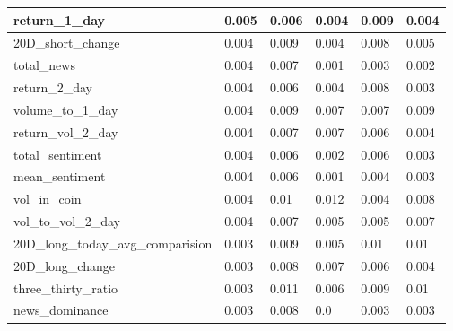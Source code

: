 \documentclass[letterpaper]{article}
\begin{document}
\begin{table}[H]
\begin{tabular}{|l|l|l|l|l|l|}
    return\_1\_day                      & 0.005        & 0.006        & 0.004        & 0.009        & 0.004        \\ \hline
    20D\_short\_change                  & 0.004        & 0.009        & 0.004        & 0.008        & 0.005        \\ \hline
    total\_news                         & 0.004        & 0.007        & 0.001        & 0.003        & 0.002        \\ \hline
    return\_2\_day                      & 0.004        & 0.006        & 0.004        & 0.008        & 0.003        \\ \hline
    volume\_to\_1\_day                  & 0.004        & 0.009        & 0.007        & 0.007        & 0.009        \\ \hline
    return\_vol\_2\_day                 & 0.004        & 0.007        & 0.007        & 0.006        & 0.004        \\ \hline
    total\_sentiment                    & 0.004        & 0.006        & 0.002        & 0.006        & 0.003        \\ \hline
    mean\_sentiment                     & 0.004        & 0.006        & 0.001        & 0.004        & 0.003        \\ \hline
    vol\_in\_coin                       & 0.004        & 0.01         & 0.012        & 0.004        & 0.008        \\ \hline
    vol\_to\_vol\_2\_day                & 0.004        & 0.007        & 0.005        & 0.005        & 0.007        \\ \hline
    20D\_long\_today\_avg\_comparision  & 0.003        & 0.009        & 0.005        & 0.01         & 0.01         \\ \hline
    20D\_long\_change                   & 0.003        & 0.008        & 0.007        & 0.006        & 0.004        \\ \hline
    three\_thirty\_ratio                & 0.003        & 0.011        & 0.006        & 0.009        & 0.01         \\ \hline
    news\_dominance                     & 0.003        & 0.008        & 0.0          & 0.003        & 0.003        \\ \hline
\end{tabular}
\end{table}

\newpage
\end{document}
